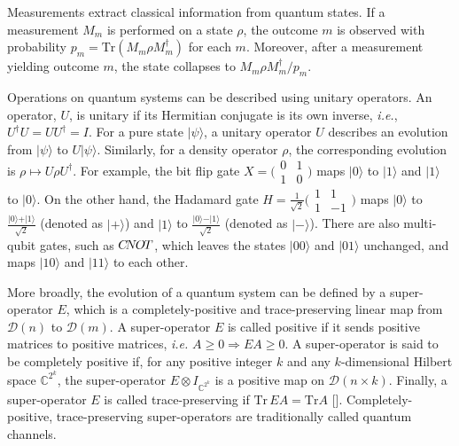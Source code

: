 Measurements extract classical information from quantum states.  If a measurement ${M_m}$ is performed on a state $\rho$, the outcome $m$ is observed with probability $p_m = \text{Tr}(M_{m} \rho M^{\dag}_{m})$ for each $m$. Moreover, after a measurement yielding outcome $m$, the state collapses to $M_{m}\rho M^{\dag}_{m}/p_{m}$. 


Operations on quantum systems can be described using unitary operators. An operator, $U$, is unitary if its Hermitian conjugate is its own inverse, \textit{i.e.}, $U^{\dag} U= UU^{\dag} = I$. For a pure state $|\psi \rangle$, a unitary operator $U$ describes an evolution from $|\psi \rangle$ to $ U|\psi \rangle$. Similarly, for a density operator $\rho $, the corresponding evolution is $\rho \mapsto U\rho U^{\dag}$. For example, the bit flip gate $X=\big(\begin{smallmatrix}
  0 & 1\\
  1 & 0
\end{smallmatrix}\big)$ maps  $\vert 0 \rangle$  to  $\vert 1 \rangle$ and  $\vert 1 \rangle$  to  $\vert 0 \rangle$. On the other hand, the Hadamard gate $H= \frac{1}{\sqrt{2}}\big(\begin{smallmatrix}
  1 & 1\\
  1 & -1
\end{smallmatrix}\big)$ maps $\vert 0 \rangle$ to  $ \frac{\vert 0 \rangle + \vert 1 \rangle }{\sqrt{2}} $ (denoted as $\vert + \rangle $) and $\vert 1 \rangle$ to $ \frac{\vert 0 \rangle - \vert 1 \rangle }{\sqrt{2}} $ (denoted as $\vert - \rangle $). There are also multi-qubit gates, such as $C\hspace{-2pt}N\hspace{-1pt}O\hspace{-1pt}T$, which leaves the states $\vert 0 0 \rangle$ and  $\vert 0 1 \rangle$ unchanged, and maps $\vert 1 0 \rangle$ and $\vert 1 1 \rangle$ to each other.

More broadly, the evolution of a quantum system can be defined by a super-operator $E$, which is a completely-positive and trace-preserving linear map from $\mathcal{D} (n)$ to $\mathcal{D} (m)$. A super-operator $E$ is called positive if it sends positive matrices to positive matrices, \textit{i.e.} $A \geq 0 \Rightarrow{} E A \geq 0$. A super-operator is said to be completely positive if, for any positive integer $k$ and any $k$-dimensional Hilbert space $\mathbb{C}^{2^{k}}$, the super-operator $E \otimes I_{\mathbb{C}^{2^{k}}}$ is a positive map on $\mathcal{D}(n \times k)$. Finally, a super-operator
$E$ is called trace-preserving if $\text{Tr} \hspace{ 2pt} E A = \text{Tr} A$ [\cite{watrous2018theory}]. Completely-positive, trace-preserving super-operators are traditionally called quantum channels.

